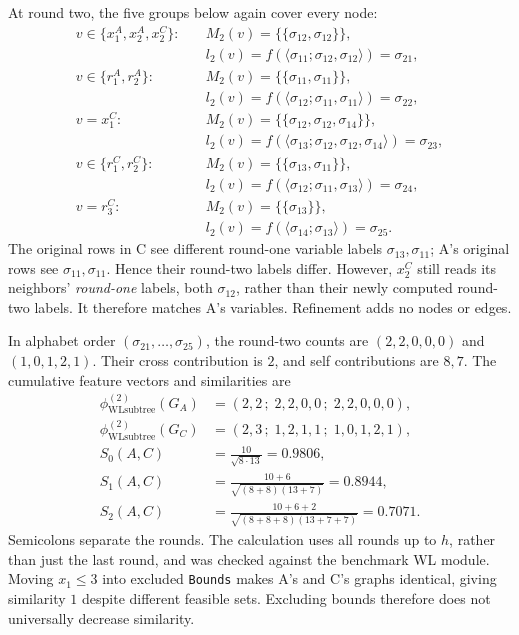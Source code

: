 \documentclass[11pt]{article}
\newcommand{\WL}{\mathrm{WLsubtree}}
\begin{document}
\begin{enumerate}[label=(AssoE.\arabic*),leftmargin=*]
At round two, the five groups below again cover every node:
\[
\begin{aligned}
v\in\{x_1^A,x_2^A,x_2^C\}:&
\quad M_2(v)=\{\!\{\sigma_{12},\sigma_{12}\}\!\},\\[-2pt]
&\quad l_2(v)=f(\langle\sigma_{11};\sigma_{12},\sigma_{12}\rangle)
=\sigma_{21},\\
v\in\{r_1^A,r_2^A\}:&
\quad M_2(v)=\{\!\{\sigma_{11},\sigma_{11}\}\!\},\\[-2pt]
&\quad l_2(v)=f(\langle\sigma_{12};\sigma_{11},\sigma_{11}\rangle)
=\sigma_{22},\\
v=x_1^C:&
\quad M_2(v)=\{\!\{\sigma_{12},\sigma_{12},\sigma_{14}\}\!\},\\[-2pt]
&\quad l_2(v)=f(\langle\sigma_{13};
\sigma_{12},\sigma_{12},\sigma_{14}\rangle)=\sigma_{23},\\
v\in\{r_1^C,r_2^C\}:&
\quad M_2(v)=\{\!\{\sigma_{13},\sigma_{11}\}\!\},\\[-2pt]
&\quad l_2(v)=f(\langle\sigma_{12};\sigma_{11},\sigma_{13}\rangle)
=\sigma_{24},\\
v=r_3^C:&
\quad M_2(v)=\{\!\{\sigma_{13}\}\!\},\\[-2pt]
&\quad l_2(v)=f(\langle\sigma_{14};\sigma_{13}\rangle)=\sigma_{25}.
\end{aligned}
\]
The original rows in C see different round-one variable labels
$\sigma_{13},\sigma_{11}$; A's original rows see
$\sigma_{11},\sigma_{11}$. Hence their round-two labels differ.
However, $x_2^C$ still reads its neighbors' \emph{round-one}
labels, both $\sigma_{12}$, rather than their newly computed
round-two labels. It therefore matches A's variables.
Refinement adds no nodes or edges.

In alphabet order $(\sigma_{21},\ldots,\sigma_{25})$, the round-two
counts are $(2,2,0,0,0)$ and $(1,0,1,2,1)$.
Their cross contribution is $2$, and self contributions are $8,7$.
The cumulative feature vectors and similarities are
\[
\begin{aligned}
\phi^{(2)}_{\WL}(G_A)&=(2,2\,;\;2,2,0,0\,;\;2,2,0,0,0),\\
\phi^{(2)}_{\WL}(G_C)&=(2,3\,;\;1,2,1,1\,;\;1,0,1,2,1),\\
S_0(A,C)&=\frac{10}{\sqrt{8\cdot13}}=0.9806,\\
S_1(A,C)&=\frac{10+6}{\sqrt{(8+8)(13+7)}}=0.8944,\\
S_2(A,C)&=\frac{10+6+2}{\sqrt{(8+8+8)(13+7+7)}}=0.7071.
\end{aligned}
\]
Semicolons separate the rounds. The calculation uses all rounds up to
$h$, rather than just the last round, and was checked against the
benchmark WL module. Moving $x_1\leq3$ into excluded \texttt{Bounds}
makes A's and C's graphs identical, giving similarity $1$ despite
different feasible sets. Excluding bounds therefore does not
universally decrease similarity.


\end{enumerate}
\end{document}
